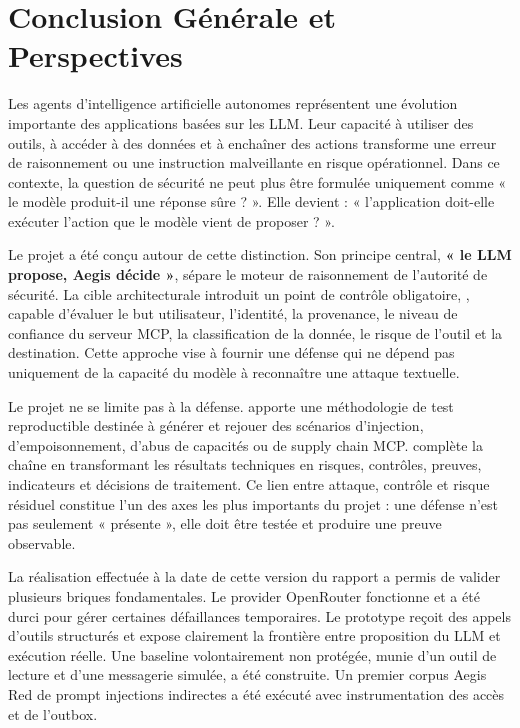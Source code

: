 \chapter*{Conclusion Générale et Perspectives}

Les agents d'intelligence artificielle autonomes représentent une évolution importante des applications basées sur les LLM. Leur capacité à utiliser des outils, à accéder à des données et à enchaîner des actions transforme une erreur de raisonnement ou une instruction malveillante en risque opérationnel. Dans ce contexte, la question de sécurité ne peut plus être formulée uniquement comme « le modèle produit-il une réponse sûre ? ». Elle devient : « l'application doit-elle exécuter l'action que le modèle vient de proposer ? ».

Le projet \Aegis{} a été conçu autour de cette distinction. Son principe central, \textbf{« le LLM propose, Aegis décide »}, sépare le moteur de raisonnement de l'autorité de sécurité. La cible architecturale introduit un point de contrôle obligatoire, \Guard{}, capable d'évaluer le but utilisateur, l'identité, la provenance, le niveau de confiance du serveur MCP, la classification de la donnée, le risque de l'outil et la destination. Cette approche vise à fournir une défense qui ne dépend pas uniquement de la capacité du modèle à reconnaître une attaque textuelle.

Le projet ne se limite pas à la défense. \Red{} apporte une méthodologie de test reproductible destinée à générer et rejouer des scénarios d'injection, d'empoisonnement, d'abus de capacités ou de supply chain MCP. \GRC{} complète la chaîne en transformant les résultats techniques en risques, contrôles, preuves, indicateurs et décisions de traitement. Ce lien entre attaque, contrôle et risque résiduel constitue l'un des axes les plus importants du projet : une défense n'est pas seulement « présente », elle doit être testée et produire une preuve observable.

La réalisation effectuée à la date de cette version du rapport a permis de valider plusieurs briques fondamentales. Le provider OpenRouter fonctionne et a été durci pour gérer certaines défaillances temporaires. Le prototype reçoit des appels d'outils structurés et expose clairement la frontière entre proposition du LLM et exécution réelle. Une baseline volontairement non protégée, munie d'un outil de lecture et d'une messagerie simulée, a été construite. Un premier corpus Aegis Red de prompt injections indirectes a été exécuté avec instrumentation des accès et de l'outbox.

